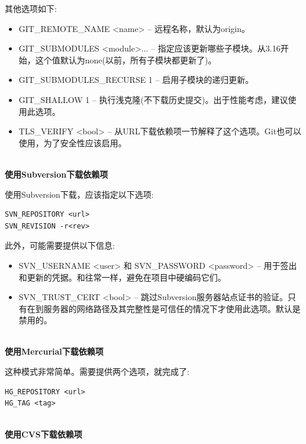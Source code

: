 其他选项如下:

\begin{itemize}
\item 
GIT\_REMOTE\_NAME <name> – 远程名称，默认为origin。

\item 
GIT\_SUBMODULES <module>... – 指定应该更新哪些子模块。从3.16开始，这个值默认为none(以前，所有子模块都更新了)。

\item 
GIT\_SUBMODULES\_RECURSE 1 – 启用子模块的递归更新。

\item 
GIT\_SHALLOW 1 – 执行浅克隆(不下载历史提交)。出于性能考虑，建议使用此选项。

\item 
TLS\_VERIFY <bool> – 从URL下载依赖项一节解释了这个选项。Git也可以使用，为了安全性应该启用。
\end{itemize}

\hspace*{\fill} \\ %
\noindent
\textbf{使用Subversion下载依赖项}

使用Subversion下载，应该指定以下选项:

\begin{lstlisting}[style=styleCMake]
SVN_REPOSITORY <url>
SVN_REVISION -r<rev>
\end{lstlisting} 

此外，可能需要提供以下信息:

\begin{itemize}
\item 
SVN\_USERNAME <user> 和 SVN\_PASSWORD <password> – 用于签出和更新的凭据。和往常一样，避免在项目中硬编码它们。
	
\item 
SVN\_TRUST\_CERT <bool> – 跳过Subversion服务器站点证书的验证。只有在到服务器的网络路径及其完整性是可信任的情况下才使用此选项。默认是禁用的。
\end{itemize}

\hspace*{\fill} \\ %
\noindent
\textbf{使用Mercurial下载依赖项}

这种模式非常简单。需要提供两个选项，就完成了:

\begin{lstlisting}[style=styleCMake]
HG_REPOSITORY <url>
HG_TAG <tag>
\end{lstlisting} 

\hspace*{\fill} \\ %
\noindent
\textbf{使用CVS下载依赖项}

